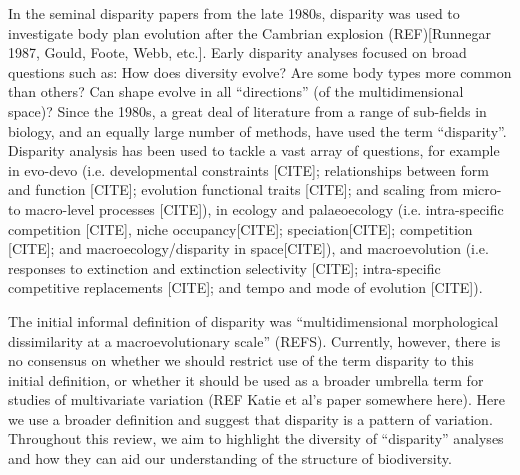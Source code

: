 \documentclass[12pt,letterpaper]{article}
\renewcommand{\subsection}[1]{%
\bigskip
\begin{center}
\begin{large}
\normalfont\itshape #1
\end{large}
\end{center}}
\begin{document}
In the seminal disparity papers from the late 1980s, disparity was used to investigate body plan evolution after the Cambrian explosion (REF)[Runnegar 1987, Gould, Foote, Webb, etc.].
Early disparity analyses focused on broad questions such as: How does diversity evolve? Are some body types more common than others? Can shape evolve in all ``directions'' (of the multidimensional space)?
Since the 1980s, a great deal of literature from a range of sub-fields in biology, and an equally large number of methods, have used the term ``disparity''.
Disparity analysis has been used to tackle a vast array of questions, for example in evo-devo (i.e. developmental constraints [CITE]; relationships between form and function [CITE]; evolution functional traits [CITE]; and scaling from micro- to macro-level processes [CITE]), in ecology and palaeoecology (i.e. intra-specific competition [CITE], niche occupancy[CITE]; speciation[CITE]; competition [CITE]; and macroecology/disparity in space[CITE]), and macroevolution (i.e. responses to extinction and extinction selectivity [CITE]; intra-specific competitive replacements [CITE]; and tempo and mode of evolution [CITE]).

The initial informal definition of disparity was ``multidimensional morphological dissimilarity at a macroevolutionary scale'' (REFS).
Currently, however, there is no consensus on whether we should restrict use of the term disparity to this initial definition, or whether it should be used as a broader umbrella term for studies of multivariate variation (REF Katie et al's paper somewhere here). 
Here we use a broader definition and suggest that disparity is a pattern of variation.
Throughout this review, we aim to highlight the diversity of ``disparity'' analyses and how they can aid our understanding of the structure of biodiversity.

\end{document}
